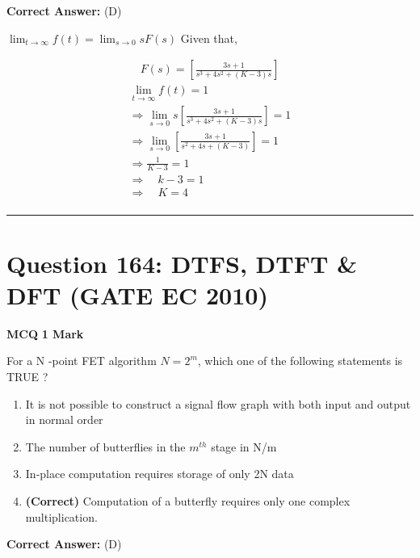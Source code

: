 \documentclass[11pt,a4paper]{article}
\begin{document}
\noindent \textbf{Correct Answer:} (D)

\begin{tcolorbox}[solbox, title=Detailed Solution -- Question 163]
$\lim _{t \rightarrow \infty} f(t)=\lim _{s \rightarrow 0} s F(s)$
 Given that,

\[
\begin{array}{l} \quad F(s)=\left[\frac{3 s+1}{s^{3}+4 s^{2}+(K-3) s}\right] \\ \lim _{t \rightarrow \infty} f(t)=1 \\ \Rightarrow \lim _{s \rightarrow 0} s\left[\frac{3 s+1}{s^{3}+4 s^{2}+(K-3) s}\right]=1 \\ \Rightarrow \lim _{s \rightarrow 0}\left[\frac{3 s+1}{s^{2}+4 s+(K-3)}\right]=1 \\ \Rightarrow \frac{1}{K-3}=1 \\ \Rightarrow \quad k-3=1 \\ \Rightarrow \quad K=4 \\ \end{array}
\]
\end{tcolorbox}

\vspace{1.5em}
\hrule
\vspace{1.5em}

\section*{Question 164: DTFS, DTFT \& DFT (GATE EC 2010)}
\noindent \textbf{\color{primary}MCQ} \hfill \textbf{\color{secondary}1 Mark}


\noindent For a N -point FET algorithm $N=2^{m}$, which one of the following statements is TRUE ?


\begin{enumerate}[label=(\Alph*)]
    \item It is not possible to construct a signal flow graph with both input and output in normal order
    \item The number of butterflies in the $m^{th}$ stage in N/m
    \item In-place computation requires storage of only 2N data
    \item \textbf{(Correct)} Computation of a butterfly requires only one complex multiplication.
\end{enumerate}

\noindent \textbf{Correct Answer:} (D)
\end{document}
